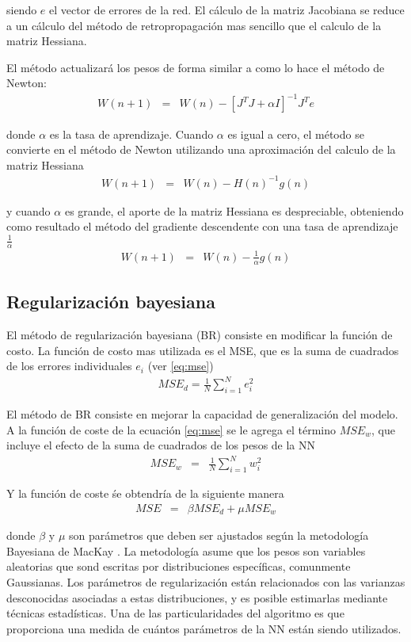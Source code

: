 siendo $e$ el vector de errores de la red. El cálculo de la matriz Jacobiana se reduce a un cálculo del método de retropropagación \cite{Hagan1994} mas sencillo que el calculo de la matriz Hessiana.

El método actualizará los pesos de forma similar a como lo hace el método de Newton:
\begin{eqnarray}
	W(n + 1) &=& W(n) - [J^{T}J + \alpha I]^{-1}J^{T}e
\end{eqnarray}

donde $\alpha$ es la tasa de aprendizaje. Cuando $\alpha$ es igual a cero, el método se convierte en el método de Newton utilizando una aproximación del calculo de la matriz Hessiana
\begin{eqnarray}
	W(n + 1) &=& W(n) - H(n)^{-1}g(n)
\end{eqnarray}

y cuando $\alpha$ es grande, el aporte de la matriz Hessiana es despreciable, obteniendo como resultado el método del gradiente descendente con una tasa de aprendizaje $\frac{1}{\alpha}$
\begin{eqnarray}
	W(n + 1) &=& W(n) - \frac{1}{\alpha}g(n)
\end{eqnarray}

\subsection{Regularización bayesiana}
El método de regularización bayesiana (BR) consiste en modificar la función de costo. La función de costo mas utilizada es el MSE, que es la suma de cuadrados de los errores individuales $e_{i}$ (ver \ref{eq:mse})
\begin{eqnarray}
	MSE_{d} = \frac{1}{N}\sum_{i = 1}^{N}e_{i}^{2}\label{eq:mse}
\end{eqnarray}

El método de BR consiste en mejorar la capacidad de generalización del modelo. A la función de coste de la ecuación \ref{eq:mse} se le agrega el término $MSE_{w}$, que incluye el efecto de la suma de cuadrados de los pesos de la NN
\begin{eqnarray}
	MSE_{w} &=& \frac{1}{N}\sum_{i = 1}^{N}w_{i}^{2}
\end{eqnarray}

Y la función de coste śe obtendría de la siguiente manera
\begin{eqnarray}
	MSE &=& \beta MSE_{d} + \mu MSE_{w}
\end{eqnarray}

donde $\beta$ y $\mu$ son parámetros que deben ser ajustados según la metodología Bayesiana de MacKay \cite{MacKay1992a, MacKay1992b}. La metodología asume que los pesos son variables aleatorias que sond escritas por distribuciones específicas, comunmente Gaussianas. Los parámetros de regularización están relacionados con las varianzas desconocidas asociadas a estas distribuciones, y es posible estimarlas mediante técnicas estadísticas. Una de las particularidades del algoritmo es que proporciona una medida de cuántos parámetros de la NN están siendo utilizados.

